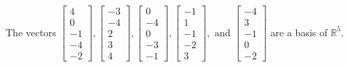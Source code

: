 \begin{exercise}
\begin{exerciseStatement}
  \end{exerciseStatement}
  \begin{exerciseAnswer}
   The vectors \(\left[\begin{array}{r}
4 \\
0 \\
-1 \\
-4 \\
-2
\end{array}\right] , \left[\begin{array}{r}
-3 \\
-4 \\
2 \\
3 \\
4
\end{array}\right] , \left[\begin{array}{r}
0 \\
-4 \\
0 \\
-3 \\
-1
\end{array}\right] , \left[\begin{array}{r}
-1 \\
1 \\
-1 \\
-2 \\
3
\end{array}\right] , \text{ and } \left[\begin{array}{r}
-4 \\
3 \\
-1 \\
0 \\
-2
\end{array}\right]\) 
  	 are  a basis of \(\mathbb{R}^5\).
  


  \end{exerciseAnswer}
\end{exercise}